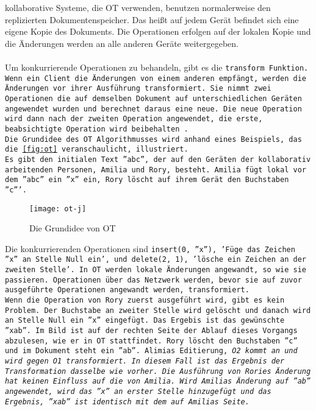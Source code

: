%
\Gls{kollaborativ}e Systeme, die \gls{OT} verwenden, benutzen normalerweise den replizierten Dokumentenspeicher.
Das heißt auf jedem Gerät befindet sich eine eigene Kopie des Dokuments.
Die Operationen erfolgen auf der lokalen Kopie und die Änderungen werden an alle anderen Geräte weitergegeben.\\\\
%
Um konkurrierende Operationen zu behandeln, gibt es die \tt{transform} Funktion.
Wenn ein Client die Änderungen von einem anderen empfängt, werden die Änderungen vor ihrer Ausführung transformiert.
Sie nimmt zwei Operationen die auf demselben Dokument auf unterschiedlichen Geräten angewendet wurden und berechnet daraus eine neue.
Die neue Operation wird dann nach der zweiten Operation angewendet, die erste, beabsichtigte Operation wird beibehalten~\cite{ot_paper}.\\
%
Die Grundidee des \gls{OT} Algorithmusses wird anhand eines Beispiels, das die \autoref{fig:ot} veranschaulicht, illustriert.\\
Es gibt den initialen Text ''abc'', der auf den Geräten der kollaborativ arbeitenden Personen, Amilia und Rory, besteht.
Amilia fügt lokal vor dem ''abc'' ein ''x'' ein, Rory löscht auf ihrem Gerät den Buchstaben ''c'''.
%
\begin{figure}[h]
  \centering
  \texttt{[image: ot-j]}
  \grayRule
  \caption{Die Grundidee von \gls{OT}}
  \label{fig:ot}
\end{figure}
%
Die konkurrierenden Operationen sind \tt{insert(0, ''x'')}, 'Füge das Zeichen ''x'' an Stelle Null ein', und \tt{delete(2, 1)}, 'lösche ein Zeichen an der zweiten Stelle'.
In \gls{OT} werden lokale Änderungen angewandt, so wie sie passieren. Operationen über das Netzwerk werden, bevor sie auf zuvor ausgeführte Operationen angewandt werden, transformiert.\\
%
Wenn die Operation von Rory zuerst ausgeführt wird, gibt es kein Problem. Der Buchstabe an zweiter Stelle wird gelöscht und danach wird an Stelle Null ein ''x'' eingefügt. Das Ergebis ist das gewünschte ''xab''.
Im Bild ist auf der rechten Seite der Ablauf dieses Vorgangs abzulesen, wie er in \gls{OT} stattfindet.
Rory löscht den Buchstaben ''c'' und im Dokument steht ein ''ab''.
Alimias Editierung, \it{O2} kommt an und wird gegen \it{O1} transformiert. In diesem Fall ist das Ergebnis der Transformation dasselbe wie vorher.
Die Ausführung von Rories Änderung hat keinen Einfluss auf die von Amilia. Wird Amilias Änderung auf ''ab'' angewendet, wird das ''x'' an erster Stelle hinzugefügt und das Ergebnis, ''xab'' ist identisch mit dem auf Amilias Seite.\\

